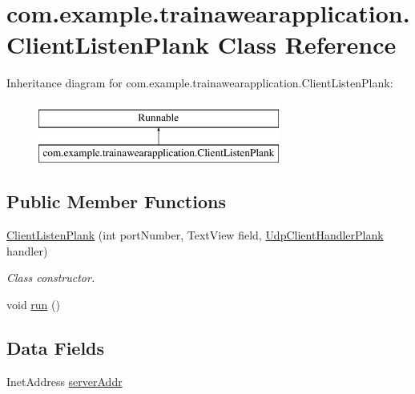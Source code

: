 \hypertarget{classcom_1_1example_1_1trainawearapplication_1_1_client_listen_plank}{}\section{com.\+example.\+trainawearapplication.\+Client\+Listen\+Plank Class Reference}
\label{classcom_1_1example_1_1trainawearapplication_1_1_client_listen_plank}
Inheritance diagram for com.\+example.\+trainawearapplication.\+Client\+Listen\+Plank\+:\begin{figure}[H]
\begin{center}
\leavevmode
\includegraphics[height=2.000000cm]{classcom_1_1example_1_1trainawearapplication_1_1_client_listen_plank}
\end{center}
\end{figure}
\subsection*{Public Member Functions}
\begin{DoxyCompactItemize}
\item 
\mbox{\hyperlink{classcom_1_1example_1_1trainawearapplication_1_1_client_listen_plank_af1cb478f41c794eaa377a1150009d070}{Client\+Listen\+Plank}} (int port\+Number, Text\+View field, \mbox{\hyperlink{classcom_1_1example_1_1trainawearapplication_1_1_udp_client_handler_plank}{Udp\+Client\+Handler\+Plank}} handler)
\begin{DoxyCompactList}\small\item\em Class constructor. \end{DoxyCompactList}\item 
void \mbox{\hyperlink{classcom_1_1example_1_1trainawearapplication_1_1_client_listen_plank_adb139f918c79291e8492364927a0b945}{run}} ()
\end{DoxyCompactItemize}
\subsection*{Data Fields}
\begin{DoxyCompactItemize}
\item 
Inet\+Address \mbox{\hyperlink{classcom_1_1example_1_1trainawearapplication_1_1_client_listen_plank_ae4ec71dafa5b734e69c3576bda12e0b8}{server\+Addr}}
\end{DoxyCompactItemize}
